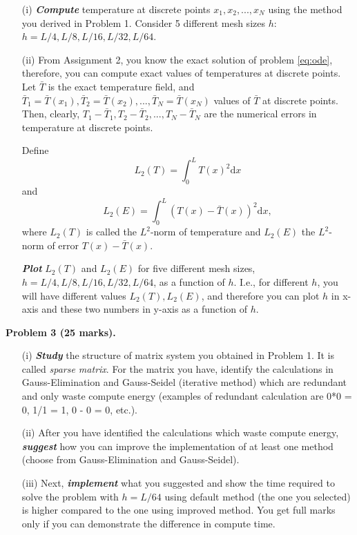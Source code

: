 \documentclass[11pt,a4paper]{report}
\newcommand{\dd}{\mathrm{d}}
\begin{document}
\begin{itemize}
\item[(i)] \textit{\textbf{Compute}} temperature at discrete points $x_1, x_2, ..., x_N$ using the method you derived in Problem 1. Consider 5 different mesh sizes $h$: $h = L/4, L/8, L/16, L/32, L/64$. 

\item[(ii)] From Assignment 2, you know the exact solution of problem \eqref{eq:ode}, therefore, you can compute exact values of temperatures at discrete points. Let $\bar{T}$ is the exact temperature field, and $\bar{T}_1 = \bar{T}(x_1), \bar{T}_2 = \bar{T}(x_2), ..., \bar{T}_N = \bar{T}(x_N)$ values of $\bar{T}$ at discrete points. Then, clearly, $T_1 - \bar{T}_1, T_2 - \bar{T}_2, ..., T_N - \bar{T}_N$ are the numerical errors in temperature at discrete points. 

Define
\begin{equation}
L_2(T) = \int_{0}^L T(x)^2 \dd x
\end{equation}
and 
\begin{equation}
L_2(E) = \int_0^L (T(x) - \bar{T}(x))^2 \dd x,
\end{equation}
where $L_2(T)$ is called the $L^2$-norm of temperature and $L_2(E)$ the $L^2$-norm of error $T(x) - \bar{T}(x)$. 

\textit{\textbf{Plot}} $L_2(T)$ and $L_2(E)$ for five different mesh sizes, $h = L/4, L/8, L/16, L/32, L/64$,  as a function of $h$. I.e., for different $h$, you will have different values $L_2(T), L_2(E)$, and therefore you can plot $h$ in x-axis and these two numbers in y-axis as a function of $h$.

\end{itemize}

\vspace{10pt}
\noindent\textbf{Problem 3 (25 marks).} 

\begin{itemize}
\item[(i)] \textit{\textbf{Study}} the structure of matrix system you obtained in Problem 1. It is called \textit{sparse matrix}. For the matrix you have, identify the calculations in  Gauss-Elimination and Gauss-Seidel (iterative  method) which are redundant and only waste compute energy (examples of redundant calculation are 0*0 = 0, 1/1 = 1, 0 - 0 = 0, etc.).

\item[(ii)] After you have identified the calculations which waste compute energy, \textit{\textbf{suggest}} how you can improve the implementation of at least one method (choose from Gauss-Elimination and Gauss-Seidel).

\item[(iii)] Next, \textit{\textbf{implement}} what you suggested and show the time required to solve the problem with $h = L/64$ using default method (the one you selected) is higher compared to the one using improved method. You get full marks only if you can demonstrate the difference in compute time. 

\end{itemize}
\end{document}
